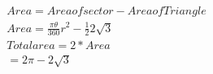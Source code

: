 \documentclass[journal,12pt,twocolumn]{IEEEtran}
\begin{document}
 \begin{align}
Area=Area of sector-Area of Triangle\\
Area=\frac{\pi\theta}{360}r^2-\frac{1}{2}2\sqrt{3}\\
Total area=2*Area\\
=2\pi-2\sqrt{3}
\end{align}

  
\end{document}
